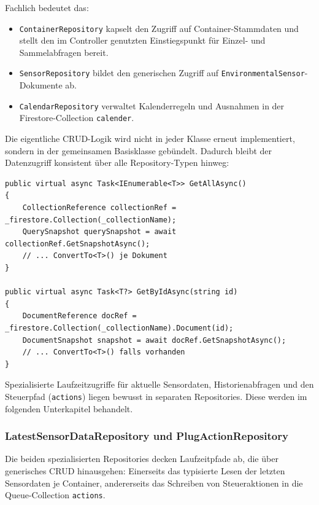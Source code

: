Fachlich bedeutet das:

\begin{itemize}
    \item \texttt{ContainerRepository} kapselt den Zugriff auf Container-Stammdaten und stellt den im Controller genutzten Einstiegspunkt für Einzel- und Sammelabfragen bereit.
    \item \texttt{SensorRepository} bildet den generischen Zugriff auf \texttt{EnvironmentalSensor}-Dokumente ab.
    \item \texttt{CalendarRepository} verwaltet Kalenderregeln und Ausnahmen in der Firestore-Collection \texttt{calender}.
\end{itemize}

Die eigentliche CRUD-Logik wird nicht in jeder Klasse erneut implementiert, sondern in der gemeinsamen Basisklasse gebündelt. Dadurch bleibt der Datenzugriff konsistent über alle Repository-Typen hinweg:

\begin{lstlisting}[language={[Sharp]C},caption={Gemeinsame CRUD-Logik in FirebaseRepository<T>},label={lst:db:repos:base-crud},basicstyle=\ttfamily\small,breaklines=true,breakatwhitespace=false,columns=fullflexible]
public virtual async Task<IEnumerable<T>> GetAllAsync()
{
    CollectionReference collectionRef = _firestore.Collection(_collectionName);
    QuerySnapshot querySnapshot = await collectionRef.GetSnapshotAsync();
    // ... ConvertTo<T>() je Dokument
}

public virtual async Task<T?> GetByIdAsync(string id)
{
    DocumentReference docRef = _firestore.Collection(_collectionName).Document(id);
    DocumentSnapshot snapshot = await docRef.GetSnapshotAsync();
    // ... ConvertTo<T>() falls vorhanden
}
\end{lstlisting}

Spezialisierte Laufzeitzugriffe für aktuelle Sensordaten, Historienabfragen und den Steuerpfad (\texttt{actions}) liegen bewusst in separaten Repositories. Diese werden im folgenden Unterkapitel behandelt.

\subsubsection{LatestSensorDataRepository und PlugActionRepository}

Die beiden spezialisierten Repositories decken Laufzeitpfade ab, die über generisches CRUD hinausgehen: Einerseits das typisierte Lesen der letzten Sensordaten je Container, andererseits das Schreiben von Steueraktionen in die Queue-Collection \texttt{actions}.

